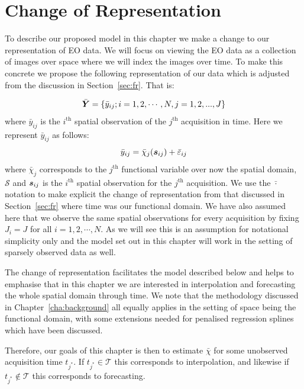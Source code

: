\section{Change of Representation \label{sec:representation}}
To describe our proposed model in this chapter we make a change to our representation of EO data.
We will focus on viewing the EO data as a collection of images over space where we will index the images over time.
To make this concrete we propose the following representation of our data which is adjusted from the discussion in Section~\ref{sec:fr}.
That is: 

\begin{equation}
	\bar{\bm{{Y}}} = \{ \bar{y}_{ij}; i=1, 2, \cdots, N, j = 1, 2, ... ,J\}
\end{equation}
where $\bar{y}_{ij}$ is the $i^\text{th}$ spatial observation of the $j^\text{th}$ acquisition in time.
Here we represent $\bar{y}_{ij}$ as follows:
\begin{equation}
	\bar{y}_{ij} = \bar{\chi}_j(\bm{{s}}_{ij})  + \bar{\varepsilon}_{ij}
	\label{eqn:space_obs}
\end{equation}
where $\bar{\chi}_j$ corresponds to the $j^\text{th}$  functional variable over now the spatial domain, $\mathcal{S}$ and $\bm{{s}}_{ij}$ is the $i^\text{th}$ spatial observation for the $j^\text{th}$ acquisition.
We use the $\bar{\cdot}$ notation to make explicit the change of representation from that discussed in Section~\ref{sec:fr} where time was our functional domain.
We have also assumed here that we observe the same spatial observations for every acquisition by fixing $J_i = J$ for all $i=1, 2, \cdots, N$.
As we will see this is an assumption for notational simplicity only and the model set out in this chapter will work in the setting of sparsely observed data as well. 

The change of representation facilitates the model described below and helps to emphasise that in this chapter we are interested in interpolation and forecasting the whole spatial domain through time.
We note that the methodology discussed in Chapter~\ref{cha:background} all equally applies in the setting of space being the functional domain, with some extensions needed for penalised regression splines which have been discussed.

Therefore, our goals of this chapter is then to estimate $\bar{\chi}$ for some unobserved acquisition time $t_{j^*}$.
If $t_{j^*} \in \mathcal{T}$ this corresponds to interpolation, and likewise if $t_{j^*} \not \in \mathcal{T}$ this corresponds to forecasting.

